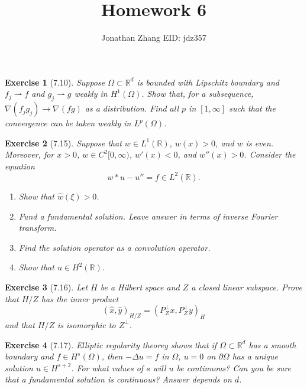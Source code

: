 \documentclass[letterpaper,twoside,11pt]{article}
\theoremstyle{mystyle}
\newtheorem*{exercise}{Exercise}
\newcommand{\R}{{\mathbb R}}
\begin{document}
\title{\vspace{-2\baselineskip} 
Homework 6
}
\author{Jonathan Zhang \qquad EID: { jdz357} }
\date{}
\maketitle



\begin{exercise}[7.10]
Suppose $\Omega\subset \R^d$ is bounded with Lipschitz boundary and $f_j \rightharpoonup f$ and $g_j\rightharpoonup g$ weakly in $H^1\left( \Omega \right)$. Show that, for a subsequence, $\nabla \left( f_jg_j \right) \to \nabla (fg)$ as a distribution. Find all $p$ in $[1,\infty]$ such that the convergence can be taken weakly in $L^p\left( \Omega \right)$. 
\end{exercise}







\begin{exercise}[7.15]
Suppose that $w \in L^1\left( \R \right)$, $w(x) > 0$, and $w$ is even. Moreover, for $x > 0$, $w \in C^2[0, \infty)$, $w'(x) < 0$, and $w''(x) >0$. Consider the equation 
\[w\ast u - u'' = f\in L^2\left( \R \right).\]
\begin{enumerate}
  \item Show that $\hat w \left( \xi \right) >0$. 
  \item Fund a fundamental solution. Leave answer in terms of inverse Fourier transform. 
  \item Find the solution operator as a convolution operator. 
  \item Show that $u \in H^2\left( \R \right)$. 
\end{enumerate}
\end{exercise}



\begin{exercise}[7.16]
  Let $H$ be a Hilbert space and $Z$ a closed linear subspace. Prove that $H/Z$ has the inner product 
  \[\left( \hat x, \hat y \right)_{H/Z} = \left( P_Z^{\perp} x,P_Z^{\perp} y  \right)_H\]
  and that $H/Z$ is isomorphic to $Z^\perp$.

\end{exercise}



\begin{exercise}[7.17]
  Elliptic regularity theorey shows that if $\Omega \subset \R^d$ has a smooth boundary and $f \in H^s\left( \Omega \right)$, then $-\Delta u = f$ in $\Omega$, $u = 0$ on $\partial \Omega$ has a unique solution $u \in H^{s+2}$. For what values of $s$ will $u$ be continuous? Can you be sure that a fundamental solution is continuous? Answer depends on $d$. 

\end{exercise}
\end{document}
